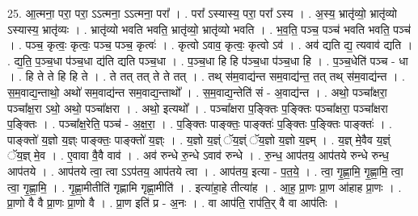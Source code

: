 \documentclass[17pt]{extarticle}
\begin{document}
25. आ॒त्मना॒ परा॒ परा॒ ऽऽत्मना॒ ऽऽत्मना॒ परा᳚ । . परा᳚ ऽस्यास्य॒ परा॒ परा᳚ ऽस्य । . अ॒स्य॒ भ्रातृ॑व्यो॒ भ्रातृ॑व्यो ऽस्यास्य॒ भ्रातृ॑व्यः । . भ्रातृ॑व्यो भवति भवति॒ भ्रातृ॑व्यो॒ भ्रातृ॑व्यो भवति । . भ॒व॒ति॒ पञ्च॒ पञ्च॑ भवति भवति॒ पञ्च॑ । . पञ्च॒ कृत्वः॒ कृत्वः॒ पञ्च॒ पञ्च॒ कृत्वः॑ । . कृत्वो ऽवाव॒ कृत्वः॒ कृत्वो ऽव॑ । . अव॑ द्यति द्य॒ त्यवाव॑ द्यति । . द्य॒ति॒ प॒ञ्च॒धा प॑ञ्च॒धा द्य॑ति द्यति पञ्च॒धा । . प॒ञ्च॒धा हि हि प॑ञ्च॒धा प॑ञ्च॒धा हि । . प॒ञ्च॒धेति॑ पञ्च - धा । . हि ते ते हि हि ते । . ते तत् तत् ते ते तत् । . तथ् स॑म॒वाद्य॑न्त सम॒वाद्य॑न्त॒ तत् तथ् स॑म॒वाद्य॑न्त । . स॒म॒वाद्य॒न्ताथो॒ अथो॑ सम॒वाद्य॑न्त सम॒वाद्य॒न्ताथो᳚ । . स॒म॒वाद्य॒न्तेति॑ सं - अ॒वाद्य॑न्त । . अथो॒ पञ्चा᳚क्षरा॒ पञ्चा᳚क्ष॒रा ऽथो॒ अथो॒ पञ्चा᳚क्षरा । . अथो॒ इत्यथो᳚ । . पञ्चा᳚क्षरा प॒ङ्क्तिः प॒ङ्क्तिः पञ्चा᳚क्षरा॒ पञ्चा᳚क्षरा प॒ङ्क्तिः । . पञ्चा᳚क्ष॒रेति॒ पञ्च॑ - अ॒क्ष॒रा॒ । . प॒ङ्क्तिः पाङ्क्तः॒ पाङ्क्तः॑ प॒ङ्क्तिः प॒ङ्क्तिः पाङ्क्तः॑ । . पाङ्क्तो॑ य॒ज्ञो य॒ज्ञ्ः पाङ्क्तः॒ पाङ्क्तो॑ य॒ज्ञ्ः । . य॒ज्ञो य॒ज्ञ्ं ॅय॒ज्ञ्ं ॅय॒ज्ञो य॒ज्ञो य॒ज्ञ्म् । . य॒ज्ञ् मे॒वैव य॒ज्ञ्ं ॅय॒ज्ञ् मे॒व । . ए॒वावा वै॒वै वाव॑ । . अव॑ रुन्धे रु॒न्धे ऽवाव॑ रुन्धे । . रु॒न्ध॒ आप॑तय॒ आप॑तये रुन्धे रुन्ध॒ आप॑तये । . आप॑तये त्वा॒ त्वा ऽऽप॑तय॒ आप॑तये त्वा । . आप॑तय॒ इत्या - प॒त॒ये॒ । . त्वा॒ गृ॒ह्णा॒मि॒ गृ॒ह्णा॒मि॒ त्वा॒ त्वा॒ गृ॒ह्णा॒मि॒ । . गृ॒ह्णा॒मीतीति॑ गृह्णामि गृह्णा॒मीति॑ । . इत्या॑हा॒हे तीत्या॑ह । . आ॒ह॒ प्रा॒णः प्रा॒ण आ॑हाह प्रा॒णः । . प्रा॒णो वै वै प्रा॒णः प्रा॒णो वै । . प्रा॒ण इति॑ प्र - अ॒नः । . वा आप॑ति॒ राप॑ति॒र् वै वा आप॑तिः । \newline
\end{document}

